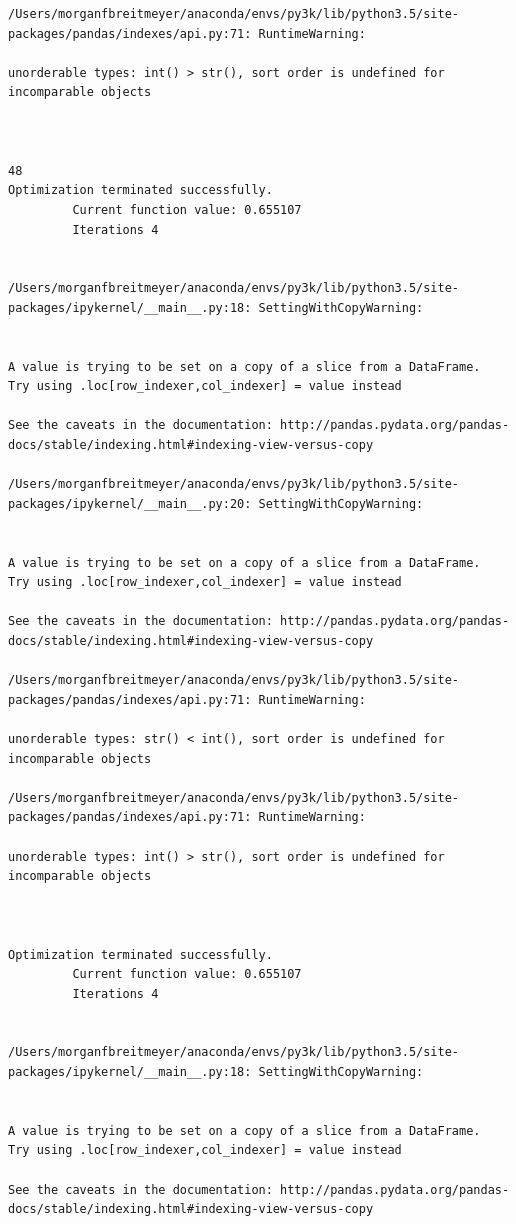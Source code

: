 \begin{lstlisting}
/Users/morganfbreitmeyer/anaconda/envs/py3k/lib/python3.5/site-packages/pandas/indexes/api.py:71: RuntimeWarning:

unorderable types: int() > str(), sort order is undefined for incomparable objects



48
Optimization terminated successfully.
         Current function value: 0.655107
         Iterations 4


/Users/morganfbreitmeyer/anaconda/envs/py3k/lib/python3.5/site-packages/ipykernel/__main__.py:18: SettingWithCopyWarning:


A value is trying to be set on a copy of a slice from a DataFrame.
Try using .loc[row_indexer,col_indexer] = value instead

See the caveats in the documentation: http://pandas.pydata.org/pandas-docs/stable/indexing.html#indexing-view-versus-copy

/Users/morganfbreitmeyer/anaconda/envs/py3k/lib/python3.5/site-packages/ipykernel/__main__.py:20: SettingWithCopyWarning:


A value is trying to be set on a copy of a slice from a DataFrame.
Try using .loc[row_indexer,col_indexer] = value instead

See the caveats in the documentation: http://pandas.pydata.org/pandas-docs/stable/indexing.html#indexing-view-versus-copy

/Users/morganfbreitmeyer/anaconda/envs/py3k/lib/python3.5/site-packages/pandas/indexes/api.py:71: RuntimeWarning:

unorderable types: str() < int(), sort order is undefined for incomparable objects

/Users/morganfbreitmeyer/anaconda/envs/py3k/lib/python3.5/site-packages/pandas/indexes/api.py:71: RuntimeWarning:

unorderable types: int() > str(), sort order is undefined for incomparable objects



Optimization terminated successfully.
         Current function value: 0.655107
         Iterations 4


/Users/morganfbreitmeyer/anaconda/envs/py3k/lib/python3.5/site-packages/ipykernel/__main__.py:18: SettingWithCopyWarning:


A value is trying to be set on a copy of a slice from a DataFrame.
Try using .loc[row_indexer,col_indexer] = value instead

See the caveats in the documentation: http://pandas.pydata.org/pandas-docs/stable/indexing.html#indexing-view-versus-copy


\end{lstlisting}
